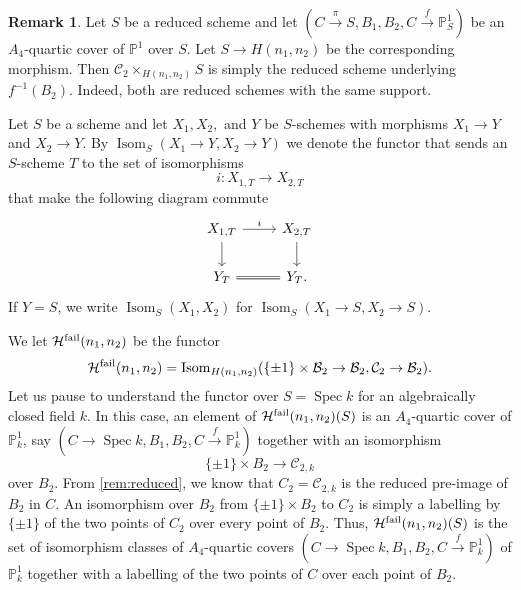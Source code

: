 \documentclass{amsart}
\numberwithin{equation}{section} \numberwithin{figure}{section}
\DeclareMathOperator{\Spec}{Spec}
\newcommand\PP{\mathbb{P}}
\newcommand{\cH}{\mathcal{H}}
\theoremstyle{one}
\theoremstyle{definition}
\newtheorem{remark}[theorem]{Remark}
\begin{document}
\begin{remark}\label{rem:reduced}
  Let \(S\) be a reduced scheme and let \((C \xrightarrow{\pi} S, B_1,B_2,  C \xrightarrow{f} \PP^1_S)\) be an \(A_4\)-quartic cover of \(\PP^1\) over \(S\).
  Let \(S \to H(n_1,n_2)\) be the corresponding morphism.
  Then \(\mathcal{C}_2 \times_{H(n_1,n_2)} S\) is simply the reduced scheme underlying \(f^{-1}(B_2)\).
  Indeed, both are reduced schemes with the same support.
\end{remark}

Let \(S\) be a scheme and let \(X_1, X_2,\) and \(Y\) be \(S\)-schemes with morphisms \(X_1 \to Y\) and \(X_2 \to Y\).
By \(\operatorname{Isom}_S(X_1 \to Y, X_2 \to Y)\) we denote the functor that sends an \(S\)-scheme \(T\) to the set of isomorphisms
\[ i \colon X_{1,T} \to X_{2,T}\]
that make the following diagram commute
\[
  \begin{tikzcd}
    X_{1,T}\ar{d}\ar{r}{i} & X_{2,T} \ar{d}\\
    Y_T\ar[equal]{r} & Y_T.
  \end{tikzcd}
\]
If $Y=S$, we write \(\operatorname{Isom}_S(X_1, X_2 )\) for \(\operatorname{Isom}_S(X_1\to S, X_2\to S )\). 

We let \(\cH^{\rm fail}(n_{1},n_2)\) be the functor 
\[ \cH^{\rm fail}(n_1,n_2) = \operatorname{Isom}_{H(n_1,n_2)}(\{\pm 1\} \times \mathcal{B}_2 \to \mathcal{B}_2, \mathcal{C}_2 \to \mathcal{B}_2).\]
Let us pause to understand the functor over \(S = \Spec k\) for an algebraically closed field \(k\).
In this case, an element of \(\cH^{\rm fail}(n_1,n_2)(S)\) is an \(A_4\)-quartic cover of \(\PP^1_k\), say  \((C\to \Spec{k}, B_1,B_2, C \xrightarrow{f} \PP^1_k)\) together with an isomorphism
\[\{\pm 1\} \times B_2 \to \mathcal{C}_{2,k}\]
over \(B_2\).
From \autoref{rem:reduced}, we know that \(C_2 = \mathcal{C}_{2,k}\) is the reduced pre-image of \(B_2\) in \(C\).
An isomorphism over \(B_2\) from \(\{\pm 1\} \times B_2\) to \(C_2\) is simply a labelling by \(\{\pm 1\}\) of the two points of \(C_2\) over every point of \(B_2\).
Thus, \(\cH^{\rm fail}(n_1,n_2)(S)\) is the set of isomorphism classes of \(A_4\)-quartic covers \((C\to \Spec{k}, B_1,B_2, C \xrightarrow{f} \PP^1_k)\) of \(\PP^1_k\) together with a labelling of the two points of \(C\) over each point of \(B_2\).
\end{document}
